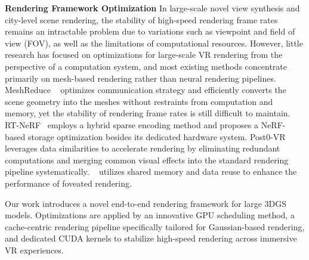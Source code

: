 \textbf{Rendering Framework Optimization} In large-scale novel view synthesis and city-level scene rendering, the stability of high-speed rendering frame rates remains an intractable problem due to variations such as viewpoint and field of view (FOV), as well as the limitations of computational resources. However, little research has focused on optimizations for large-scale VR rendering from the perspective of a computation system, and most existing methods concentrate primarily on mesh-based rendering rather than neural rendering pipelines. MeshReduce ~\cite{jin2024meshreduce} optimizes communication strategy and efficiently converts the scene geometry into the meshes without restraints from computation and memory, yet the stability of rendering frame rates is still difficult to maintain. RT-NeRF~\cite{li2022rt} employs a hybrid sparse encoding method and proposes a NeRF-based storage optimization besides its dedicated hardware system. Post0-VR~\cite{wen2023post0} leverages data similarities to accelerate rendering by eliminating redundant computations and merging common visual effects into the standard rendering pipeline systematically. ~\cite{malkin2020cuda} utilizes shared memory and data reuse to enhance the performance of foveated rendering. 

Our work introduces a novel end-to-end rendering framework for large 3DGS models. Optimizations are applied by an innovative GPU scheduling method, a cache-centric rendering pipeline specifically tailored for Gaussian-based rendering, and dedicated CUDA kernels to stabilize high-speed rendering across immersive VR experiences.

